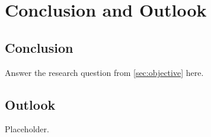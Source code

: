 
\chapter{Conclusion and Outlook}\label{ch:conclusion}

\section{Conclusion}\label{sec:conclusion}

Answer the research question from \autoref{sec:objective} here.

\section{Outlook}\label{sec:outlook}

Placeholder.
